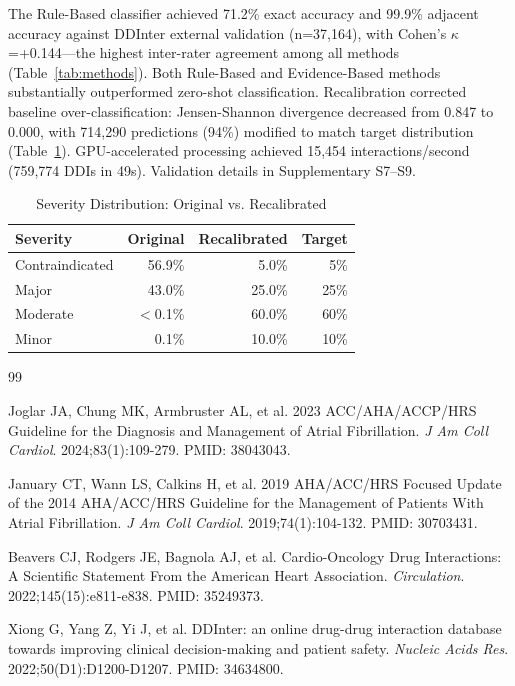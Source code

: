 \documentclass[11pt,a4paper]{article}
\begin{document}
The Rule-Based classifier achieved 71.2\% exact accuracy and 99.9\% adjacent accuracy against DDInter external validation (n=37,164), with Cohen's $\kappa$=+0.144---the highest inter-rater agreement among all methods (Table~\ref{tab:methods}). Both Rule-Based and Evidence-Based methods substantially outperformed zero-shot classification. Recalibration corrected baseline over-classification: Jensen-Shannon divergence decreased from 0.847 to 0.000, with 714,290 predictions (94\%) modified to match target distribution (Table~\ref{tab:dist}). GPU-accelerated processing achieved 15,454 interactions/second (759,774 DDIs in 49s). Validation details in Supplementary S7--S9.

\begin{table}[h]
\centering
\small
\caption{Severity Distribution: Original vs. Recalibrated}
\label{tab:dist}
\begin{tabular}{@{}lrrr@{}}
\toprule
\textbf{Severity} & \textbf{Original} & \textbf{Recalibrated} & \textbf{Target} \\
\midrule
Contraindicated & 56.9\% & 5.0\% & 5\% \\
Major & 43.0\% & 25.0\% & 25\% \\
Moderate & $<$0.1\% & 60.0\% & 60\% \\
Minor & 0.1\% & 10.0\% & 10\% \\
\bottomrule
\end{tabular}
\end{table}

\begin{thebibliography}{99}

Joglar JA, Chung MK, Armbruster AL, et al.
2023 ACC/AHA/ACCP/HRS Guideline for the Diagnosis and Management of Atrial Fibrillation.
\textit{J Am Coll Cardiol}. 2024;83(1):109-279. PMID: 38043043.

January CT, Wann LS, Calkins H, et al.
2019 AHA/ACC/HRS Focused Update of the 2014 AHA/ACC/HRS Guideline for the Management of Patients With Atrial Fibrillation.
\textit{J Am Coll Cardiol}. 2019;74(1):104-132. PMID: 30703431.

Beavers CJ, Rodgers JE, Bagnola AJ, et al.
Cardio-Oncology Drug Interactions: A Scientific Statement From the American Heart Association.
\textit{Circulation}. 2022;145(15):e811-e838. PMID: 35249373.

Xiong G, Yang Z, Yi J, et al.
DDInter: an online drug-drug interaction database towards improving clinical decision-making and patient safety.
\textit{Nucleic Acids Res}. 2022;50(D1):D1200-D1207. PMID: 34634800.

\end{thebibliography}
\end{document}
